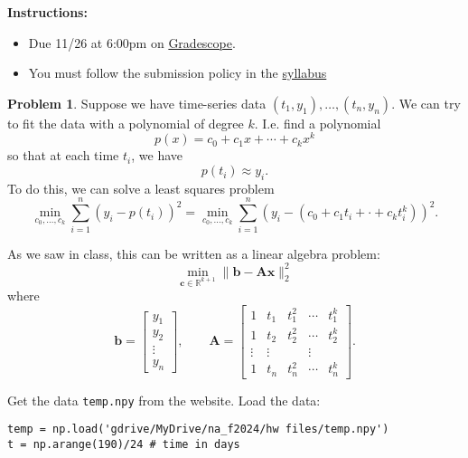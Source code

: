 \documentclass[12pt]{article}
\theoremstyle{definition}
\newtheorem{problem}{Problem}
\renewcommand{\vec}{\mathbf}
\begin{document}
\textbf{\Large{}}
    
    \vspace{-1.8em}
    \hrulefill

    \textbf{Instructions:}
    \begin{itemize}
        \item Due 11/26 at 6:00pm on \href{https://www.gradescope.com/courses/818054}{Gradescope}.
        \item You must follow the submission policy in the \href{https://courses.chen.pw/na_f2024/syllabus.html}{syllabus} 
\end{itemize}
   
\vspace{.5em}

\begin{problem}
    Suppose we have time-series data $(t_1, y_1), \ldots, (t_n,y_n)$. 
    We can try to fit the data with a polynomial of degree $k$. 
    I.e. find a polynomial 
    \[
    p(x) = c_0 + c_1 x + \cdots + c_k x^k
    \]
    so that at each time $t_i$, we have
    \[
    p(t_i) \approx y_i.
    \]
    To do this, we can solve a least squares problem
    \[
        \min_{c_0, \ldots, c_k} \sum_{i=1}^{n} ( y_i - p(t_i))^2
        =
        \min_{c_0, \ldots, c_k} \sum_{i=1}^{n} ( y_i - (c_0 + c_1 t_i + \cdot + c_k t_i^k))^2.
    \]

    As we saw in class, this can be written as a linear algebra problem:
    \[
    \min_{\vec{c}\in\mathbb{R}^{k+1}} \| \vec{b} - \vec{A}\vec{x} \|_2^2
    \]
    where
    \[
    \vec{b} = \begin{bmatrix} y_1 \\ y_2 \\ \vdots \\ y_n \end{bmatrix}
    ,\qquad
    \vec{A} = 
    \begin{bmatrix} 
        1 & t_1 & t_1^2 & \cdots & t_1^k \\
        1 & t_2 & t_2^2 & \cdots & t_2^k \\
        \vdots & \vdots &&\vdots \\
        1 & t_n & t_n^2 & \cdots & t_n^k 
    \end{bmatrix}.
    \]

    Get the data \texttt{temp.npy} from the website. 
    Load the data:    
    \begin{lstlisting}
temp = np.load('gdrive/MyDrive/na_f2024/hw files/temp.npy')
t = np.arange(190)/24 # time in days
    \end{lstlisting}


\end{problem}
\end{document}
